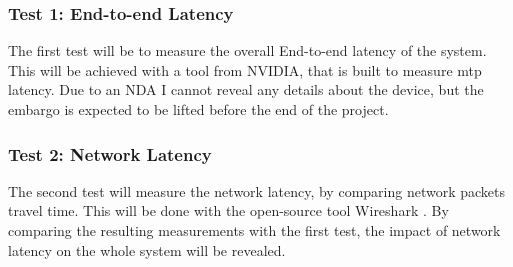 \subsubsection{Test 1: End-to-end Latency}
The first test will be to measure the overall End-to-end latency of the system. This will be achieved with a tool from NVIDIA, that is built to measure \acrshort{mtp} latency. Due to an NDA I cannot reveal any details about the device, but the embargo is expected to be lifted before the end of the project.

\subsubsection{Test 2: Network Latency}
The second test will measure the network latency, by comparing network packets travel time. This will be done with the open-source tool Wireshark \parencite{wireshark}. By comparing the resulting measurements with the first test, the impact of network latency on the whole system will be revealed.